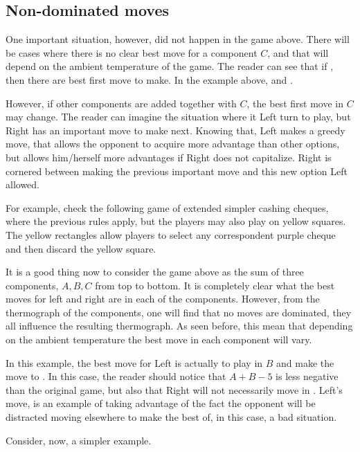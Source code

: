 \subsection*{Non-dominated moves}

One important situation, however, did not happen in the game above. There will be cases where there is no clear best move for a component $C$, and that will depend on the ambient temperature of the game. The reader can see that if , then there are best first move to make. In the example above,  and .

However, if other components are added together with $C$, the best first move in $C$ may change. The reader can imagine the situation where it Left turn to play, but Right has an important move to make next. Knowing that, Left makes a greedy move, that allows the opponent to acquire more advantage than other options, but allows him/herself more advantages if Right does not capitalize. Right is cornered between making the previous important move and this new option Left allowed.

For example, check the following game of extended simpler cashing cheques, where the previous rules apply, but the players may also play on yellow squares. The yellow rectangles allow players to select any correspondent purple cheque and then discard the yellow square.



It is a good thing now to consider the game above as the sum of three components, $A,B,C$ from top to bottom. It is completely clear what the best moves for left and right are in each of the components. However, from the thermograph of the components, one will find that no moves are dominated, they all influence the resulting thermograph. As seen before, this mean that depending on the ambient temperature the best move in each component will vary.

In this example, the best move for Left is actually to play in $B$ and make the move to . In this case, the reader should notice that $A + B - 5$ is less negative than the original game, but also that Right will not necessarily move in . Left's move, is an example of taking advantage of the fact the opponent will be distracted moving elsewhere to make the best of, in this case, a bad situation.

Consider, now, a simpler example.



